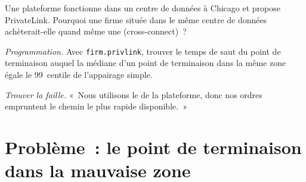 \begin{exercise}[$\star\star$]\label{exo:nw:private-connectivity-to-crypto-venues:6}
Une plateforme fonctionne dans un centre de données à Chicago et propose PrivateLink. Pourquoi une firme située dans le même centre de données achèterait-elle quand même une  (cross-connect)~?
\end{exercise}

\begin{exercise}[$\star\star\star$]\label{exo:nw:private-connectivity-to-crypto-venues:7}
\emph{Programmation.} Avec \texttt{firm.privlink}, trouver le temps de saut du point de terminaison auquel la médiane d'un point de terminaison dans la même zone égale le 99~centile de l'appairage simple.
\end{exercise}

\begin{exercise}[$\star\star\star$]\label{exo:nw:private-connectivity-to-crypto-venues:8}
\emph{Trouver la faille.} «~Nous utilisons le  de la plateforme, donc nos ordres empruntent le chemin le plus rapide disponible.~»
\end{exercise}

\section{Problème~: le point de terminaison dans la mauvaise zone}

